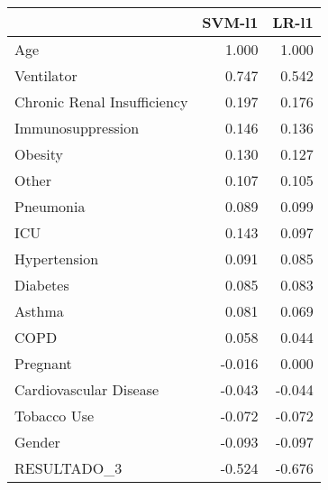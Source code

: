 \begin{tabular}{lrr}
\toprule
{} &  SVM-l1 &  LR-l1 \\
\midrule
Age                         &   1.000 &  1.000 \\
Ventilator                  &   0.747 &  0.542 \\
Chronic Renal Insufficiency &   0.197 &  0.176 \\
Immunosuppression           &   0.146 &  0.136 \\
Obesity                     &   0.130 &  0.127 \\
Other                       &   0.107 &  0.105 \\
Pneumonia                   &   0.089 &  0.099 \\
ICU                         &   0.143 &  0.097 \\
Hypertension                &   0.091 &  0.085 \\
Diabetes                    &   0.085 &  0.083 \\
Asthma                      &   0.081 &  0.069 \\
COPD                        &   0.058 &  0.044 \\
Pregnant                    &  -0.016 &  0.000 \\
Cardiovascular Disease      &  -0.043 & -0.044 \\
Tobacco Use                 &  -0.072 & -0.072 \\
Gender                      &  -0.093 & -0.097 \\
RESULTADO\_3                 &  -0.524 & -0.676 \\
\bottomrule
\end{tabular}
